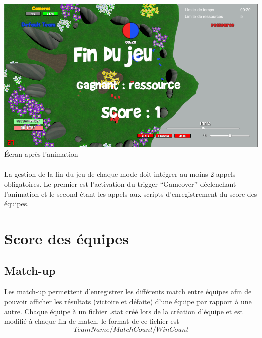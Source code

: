 \documentclass{report}
\begin{document}
\paragraph{}
\begin{center}
\includegraphics[scale=0.5]{DATA/findujeu.png}
 {Écran après l’animation}
\end{center}
\paragraph{}


La gestion de la fin du jeu de chaque mode doit intégrer au moins 2 appels obligatoires. Le premier est l’activation du trigger “Gameover” déclenchant l’animation et le second étant les appels aux scripts d’enregistrement du score des équipes.


\section{Score des équipes}

\subsection{Match-up}
Les match-up permettent d'enregistrer les différents match entre équipes afin de pouvoir afficher les résultats (victoire et défaite) d'une équipe par rapport à une autre. Chaque équipe à un fichier .stat créé lors de la création d'équipe et est modifié à chaque fin de match. le format de ce fichier est 
\[
TeamName/MatchCount/WinCount
\]
\end{document}
